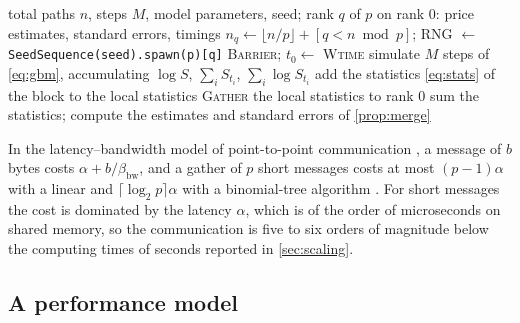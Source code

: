 \documentclass[11pt,a4paper]{article}
\begin{document}
\begin{algorithm}[ht]
\caption{MPI Monte Carlo pricer (one rank).}\label{alg:mpi}
\begin{algorithmic}[1]
\Require total paths $n$, steps $M$, model parameters, seed; rank $q$ of $p$
\Ensure on rank 0: price estimates, standard errors, timings
\State $n_q \gets \lfloor n/p\rfloor + [q < n \bmod p]$; RNG $\gets$ \texttt{SeedSequence(seed).spawn(p)[q]}
\State \textsc{Barrier}; $t_0\gets$ \textsc{Wtime}
  \State simulate $M$ steps of \cref{eq:gbm}, accumulating $\log S$, $\sum_i S_{t_i}$, $\sum_i \log S_{t_i}$ 
  \State add the statistics \cref{eq:stats} of the block to the local statistics
\EndFor
\State \textsc{Gather} the local statistics to rank 0 
 sum the statistics; compute the estimates and standard errors of \cref{prop:merge} \EndIf
\end{algorithmic}
\end{algorithm}

In the latency--bandwidth model of point-to-point communication \citep{hockney1994}, a message of $b$ bytes costs $\alpha + b/\beta_{\mathrm{bw}}$, and a gather of $p$ short messages costs at most $(p-1)\alpha$ with a linear and $\lceil\log_2 p\rceil\alpha$ with a binomial-tree algorithm \citep{thakur2005}.
For short messages the cost is dominated by the latency $\alpha$, which is of the order of microseconds on shared memory, so the communication is five to six orders of magnitude below the computing times of seconds reported in \cref{sec:scaling}.

\subsection{A performance model}\label{sec:perf-model}
\end{document}
